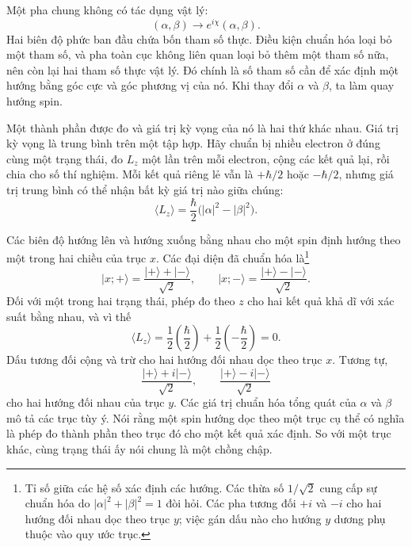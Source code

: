 Một pha chung không có tác dụng vật lý:
\begin{equation}
(\alpha,\beta)\longrightarrow
e^{i\chi}(\alpha,\beta).
\end{equation}
Hai biên độ phức ban đầu chứa bốn tham số thực. Điều kiện chuẩn hóa loại bỏ một tham số, và pha toàn cục không liên quan loại bỏ thêm một tham số nữa, nên còn lại hai tham số thực vật lý. Đó chính là số tham số cần để xác định một hướng bằng góc cực và góc phương vị của nó. Khi thay đổi \(\alpha\) và \(\beta\), ta làm quay hướng spin.

Một thành phần được đo và giá trị kỳ vọng của nó là hai thứ khác nhau. Giá trị kỳ vọng là trung bình trên một tập hợp. Hãy chuẩn bị nhiều electron ở đúng cùng một trạng thái, đo \(L_z\) một lần trên mỗi electron, cộng các kết quả lại, rồi chia cho số thí nghiệm. Mỗi kết quả riêng lẻ vẫn là \(+\hbar/2\) hoặc \(-\hbar/2\), nhưng giá trị trung bình có thể nhận bất kỳ giá trị nào giữa chúng:
\begin{equation}
\langle L_z\rangle
=
\frac{\hbar}{2}\bigl(|\alpha|^2-|\beta|^2\bigr).
\end{equation}

Các biên độ hướng lên và hướng xuống bằng nhau cho một spin định hướng theo một trong hai chiều của trục \(x\). Các đại diện đã chuẩn hóa là\footnote{Tỉ số giữa các hệ số xác định các hướng. Các thừa số \(1/\sqrt2\) cung cấp sự chuẩn hóa do \( |\alpha|^2+|\beta|^2=1\) đòi hỏi. Các pha tương đối \(+i\) và \(-i\) cho hai hướng đối nhau dọc theo trục \(y\); việc gán dấu nào cho hướng \(y\) dương phụ thuộc vào quy ước trục.}
\begin{equation}
\lvert x;+\rangle
=
\frac{\lvert+\rangle+\lvert-\rangle}{\sqrt2},
\qquad
\lvert x;-\rangle
=
\frac{\lvert+\rangle-\lvert-\rangle}{\sqrt2}.
\end{equation}
Đối với một trong hai trạng thái, phép đo theo \(z\) cho hai kết quả khả dĩ với xác suất bằng nhau, và vì thế
\begin{equation}
\langle L_z\rangle
=
\frac12\left(\frac{\hbar}{2}\right)
+
\frac12\left(-\frac{\hbar}{2}\right)
=0.
\end{equation}
Dấu tương đối cộng và trừ cho hai hướng đối nhau dọc theo trục \(x\). Tương tự,
\begin{equation}
\frac{\lvert+\rangle+i\lvert-\rangle}{\sqrt2},
\qquad
\frac{\lvert+\rangle-i\lvert-\rangle}{\sqrt2}
\end{equation}
cho hai hướng đối nhau của trục \(y\). Các giá trị chuẩn hóa tổng quát của \(\alpha\) và \(\beta\) mô tả các trục tùy ý. Nói rằng một spin hướng dọc theo một trục cụ thể có nghĩa là phép đo thành phần theo trục đó cho một kết quả xác định. So với một trục khác, cùng trạng thái ấy nói chung là một chồng chập.

